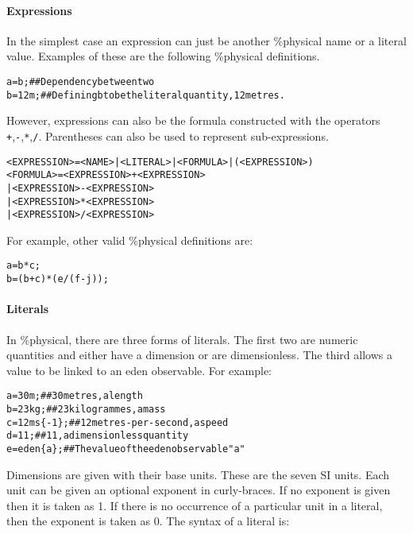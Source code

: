 \documentclass[a4paper]{article}
\begin{document}
\paragraph{Expressions}
In the simplest case an expression can just be another \%physical name or a 
literal value. Examples of these are the following \%physical definitions.

\begin{alltt}
%physical
a = b;       ## Dependency between two %physical observables
b = 12 m;    ## Defining b to be the literal quantity, 12 metres.
\end{alltt}

However, expressions can also be the formula constructed with the operators
\texttt{+},\texttt{-},\texttt{*},\texttt{/}. Parentheses can also be used to 
represent sub-expressions.

\begin{alltt}
<EXPRESSION> = <NAME> | <LITERAL> | <FORMULA> | ( <EXPRESSION> ) 
<FORMULA>    = <EXPRESSION> + <EXPRESSION>
             | <EXPRESSION> - <EXPRESSION>
             | <EXPRESSION> * <EXPRESSION>
             | <EXPRESSION> / <EXPRESSION>
\end{alltt}

For example, other valid \%physical definitions are:

\begin{alltt}
%physical
a = b*c;
b = (b+c)*(e/(f-j));
\end{alltt}

\paragraph{Literals}
In \%physical, there are three forms of literals. The first two are numeric 
quantities and either have a dimension or are dimensionless.
The third allows a value to be linked to an eden observable. For example:

\begin{alltt}
a = 30 m;      ## 30 metres, a length
b = 23 kg;     ## 23 kilogrammes, a mass
c = 12 ms\{-1\}; ## 12 metres-per-second, a speed
d = 11;        ## 11, a dimensionless quantity
e = eden\{a\};   ## The value of the eden observable "a"
\end{alltt}

Dimensions are given with their base units. These are the seven SI units. 
Each unit can be given an optional exponent in curly-braces. If no exponent 
is given then it is taken as 1. If there is no occurrence of a particular
unit in a literal, then the exponent is taken as 0.
The syntax of a literal is:
\end{document}
